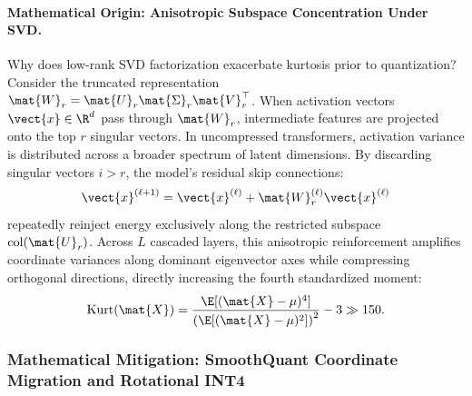 \paragraph{Mathematical Origin: Anisotropic Subspace Concentration Under SVD.}
Why does low-rank SVD factorization exacerbate kurtosis prior to quantization? Consider the truncated representation $\mat{W}_r = \mat{U}_r \mat{\Sigma}_r \mat{V}_r^\top$. When activation vectors $\vect{x} \in \R^d$ pass through $\mat{W}_r$, intermediate features are projected onto the top $r$ singular vectors. In uncompressed transformers, activation variance is distributed across a broader spectrum of latent dimensions. By discarding singular vectors $i > r$, the model's residual skip connections:
\begin{equation}
\vect{x}^{(\ell+1)} = \vect{x}^{(\ell)} + \mat{W}_r^{(\ell)} \vect{x}^{(\ell)}
\end{equation}
repeatedly reinject energy exclusively along the restricted subspace $\operatorname{col}(\mat{U}_r)$. Across $L$ cascaded layers, this anisotropic reinforcement amplifies coordinate variances along dominant eigenvector axes while compressing orthogonal directions, directly increasing the fourth standardized moment:
\begin{equation}
\operatorname{Kurt}(\mat{X}) = \frac{\E[(\mat{X} - \mu)^4]}{\left(\E[(\mat{X} - \mu)^2]\right)^2} - 3 \gg 150.
\end{equation}

\subsubsection{Mathematical Mitigation: SmoothQuant Coordinate Migration and Rotational INT4}
\label{sec:phenom_kurtosis_resolution}

